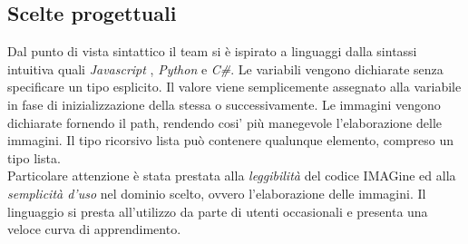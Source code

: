 \documentclass[10pt]{article}
\begin{document}
\subsection{Scelte progettuali}
Dal punto di vista sintattico il team si è ispirato a linguaggi dalla sintassi intuitiva quali \textit{Javascript} , \textit{Python} e \textit{C\#}. Le variabili vengono dichiarate senza specificare un tipo esplicito. Il valore viene semplicemente assegnato alla variabile in fase di inizializzazione della stessa o successivamente. Le immagini vengono dichiarate fornendo il path, rendendo cosi' più manegevole l'elaborazione delle immagini. Il tipo ricorsivo lista può contenere qualunque elemento, compreso un tipo lista.\\
Particolare attenzione è stata prestata alla \textit{leggibilità} del codice IMAGine ed alla \textit{semplicità d'uso} nel dominio scelto, ovvero l'elaborazione delle immagini. Il linguaggio si presta all'utilizzo da parte di utenti occasionali e presenta una veloce curva di apprendimento.
\end{document}
